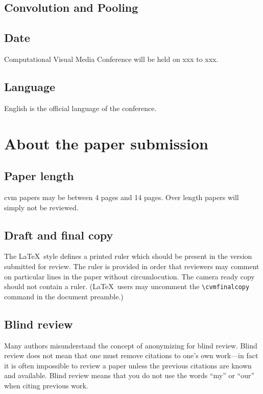 \documentclass[10pt,twocolumn,letterpaper]{article}
\begin{document}
\subsection{Convolution and Pooling}


\subsection{Date}
Computational Visual Media Conference will be held on xxx to xxx.

\subsection{Language}
English is the official language of the conference.

\section{About the paper submission}

\subsection{Paper length}
cvm papers may be between 4 pages and 14 pages. Over length papers will simply not be reviewed.

\subsection{Draft and final copy}
The \LaTeX\ style defines a printed ruler which should be present in the
version submitted for review.  The ruler is provided in order that
reviewers may comment on particular lines in the paper without
circumlocution. The camera ready copy should not contain a ruler.
(\LaTeX\ users may uncomment the \verb'\cvmfinalcopy' command in the document preamble.)

\subsection{Blind review}
Many authors misunderstand the concept of anonymizing for blind
review.  Blind review does not mean that one must remove
citations to one's own work---in fact it is often impossible to
review a paper unless the previous citations are known and
available.
Blind review means that you do not use the words ``my'' or ``our''
when citing previous work.
\end{document}
